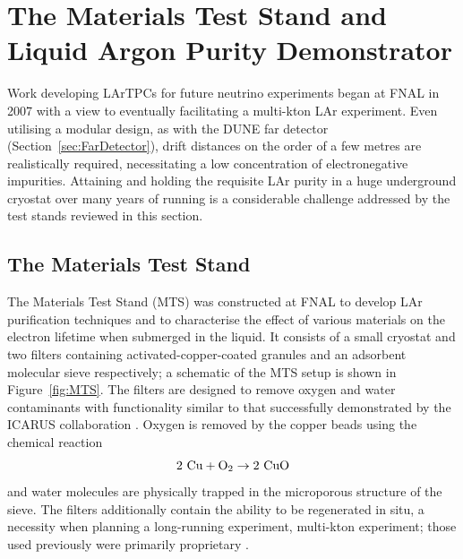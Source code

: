 \section[The Materials Test Stand and Liquid Argon Purity Demonstrator]{The Materials Test Stand and\\Liquid Argon Purity Demonstrator}\label{sec:MTSLAPD}

Work developing LArTPCs for future neutrino experiments began at FNAL in 2007 with a view to eventually facilitating a multi-kton LAr experiment.  Even utilising a modular design, as with the DUNE far detector (Section~\ref{sec:FarDetector}), drift distances on the order of a few metres are realistically required, necessitating a low concentration of electronegative impurities.  Attaining and holding the requisite LAr purity in a huge underground cryostat over many years of running is a considerable challenge addressed by the test stands reviewed in this section.

\subsection{The Materials Test Stand}\label{sec:MTS}

The Materials Test Stand (MTS) \cite{MTS2006,MTS2009a,MTS2009b,MTS2011} was constructed at FNAL to develop LAr purification techniques and to characterise the effect of various materials on the electron lifetime when submerged in the liquid.  It consists of a small cryostat and two filters containing activated-copper-coated granules and an adsorbent molecular sieve respectively; a schematic of the MTS setup is shown in Figure~\ref{fig:MTS}.  The filters are designed to remove oxygen and water contaminants with functionality similar to that successfully demonstrated by the ICARUS collaboration \cite{ICARUS1993b}.  Oxygen is removed by the copper beads using the chemical reaction
\begin{equation}
  2~\textnormal{Cu} + \textnormal{O}_2 \rightarrow 2~\textnormal{CuO}
\end{equation}
and water molecules are physically trapped in the microporous structure of the sieve.  The filters additionally contain the ability to be regenerated in situ, a necessity when planning a long-running experiment, multi-kton experiment; those used previously were primarily proprietary \cite{ICARUS1993a,ICARUS2006}.


